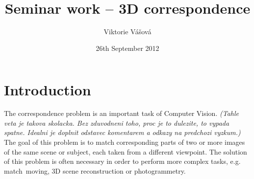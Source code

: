 \documentclass[12pt]{article}
\newcommand{\lmv}[1]{\textit{\textcolor{OliveGreen}{(#1)}}}
\begin{document}
	\title{Seminar work -- 3D correspondence} %
	\author{Viktorie V\'{a}\v{s}ov\'{a}}
	\date{26th September 2012}
	
	\maketitle
	
	\section{Introduction}
	The correspondence problem is an important task of Computer Vision. \lmv{Tahle veta je takova skolacka. Bez zduvodneni toho, proc je to dulezite, to vypada spatne. Idealni je doplnit odstavec komentarem a odkazy na predchozi vyzkum.}
	The goal of this problem is to match corresponding parts of two or more images of the same scene or subject, each taken from a different viewpoint. 
	The solution of this problem is often necessary in order to perform more complex tasks, e.g. match~moving, 3D scene reconstruction or photogrammetry.  
	
\end{document}
